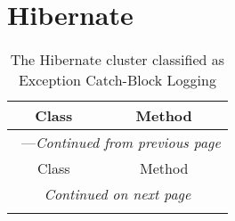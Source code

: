 \section{Hibernate}\label{hibernate}

\begin{center}
\begin{longtable}{ll}
\caption{The Hibernate cluster classified as Exception Catch-Block Logging}\\
\toprule\multicolumn{1}{c}{Class}&\multicolumn{1}{c}{Method}\\\midrule
\endfirsthead

\multicolumn{2}{c}{\tablename\ \thetable{}---\textit{Continued from previous page}} \\\midrule
\multicolumn{1}{c}{Class}&\multicolumn{1}{c}{Method}\\\midrule
\endhead
\multicolumn{2}{c}{\textit{Continued on next page}}\\\midrule
\endfoot
\bottomrule
\endlastfoot


\end{longtable}
\end{center}
